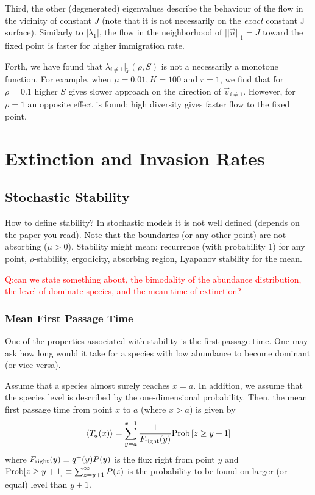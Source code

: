 \documentclass[9pt,twocolumn,twoside,lineno]{pnas-new}
\begin{document}
Third, the other (degenerated) eigenvalues describe the behaviour of the flow in the vicinity of constant $J$ (note that it is not necessarily on the {\em exact} constant J surface). Similarly to $|\lambda_1|$, the flow in the neighborhood of $||\vec{n}||_1=J$ toward the fixed point is faster for higher immigration rate. 

Forth, we have found that $\lambda_{i\neq 1}|_{\tilde{x}}(\rho,S)$ is not a necessarily a monotone function. For example, when $\mu=0.01, K=100$ and $r=1$, we find that for $\rho=0.1$ higher $S$ gives slower approach on the direction of $\vec{v}_{i\neq 1}$. However, for $\rho=1$ an opposite effect is found; high diversity gives faster flow to the fixed point.   



\section{Extinction and Invasion Rates}

\subsection{Stochastic Stability}

How to define stability? In stochastic models it is not well defined (depends on the paper you read). Note that the boundaries (or any other point) are not absorbing ($\mu>0$). Stability might mean: recurrence (with probability 1) for any point, $\rho$-stability, ergodicity, absorbing region, Lyapanov stability for the mean.   

\textcolor{red}{Q:can we state something about, the bimodality of the abundance distribution,  the level of dominate species, and the mean time of extinction?  }

\subsubsection{Mean First Passage Time}
One of the properties associated with stability is the first passage time. One may ask how long would it take for a species with low abundance to become dominant (or vice versa). 

Assume that a species almost surely reaches $x=a$. In addition, we assume that the species level is described by the one-dimensional probability. Then, the mean first passage time from point $x$ to $a$ (where $x>a$) is given by 
\begin{equation}
   \langle T_a(x) \rangle =   \sum_{y=a}^{x-1}\frac{1}{F_{\rm right}(y)}{\rm Prob}\left[z\geq y+1\right] \label{eq:MFPT}
\end{equation}
where $F_{\rm right}(y)\equiv q^+(y)P(y)$ is the flux right from point $y$ and ${\rm Prob}[z\geq y+1]\equiv \sum_{z=y+1}^{\infty}P(z)$ is the probability to be found on larger (or equal) level than $y+1$.
\end{document}

